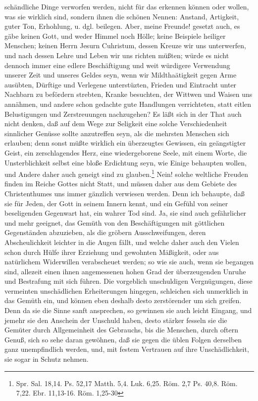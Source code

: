 schändliche Dinge verworfen werden, nicht für das erkennen können oder wollen, was sie wirklich sind, sondern ihnen die schönen Nennen: Anstand, Artigkeit, guter Ton, Erhohlung, u. dgl. beilegen. Aber, meine Freunde! gesetzt auch, es gäbe keinen Gott, und weder Himmel noch Hölle; keine Beispiele heiliger Menschen; keinen Herrn Jesurn Cuhristum, dessen Kreuze wir uns unterwerfen, und nach dessen Lehre und Leben wir uns richten müßten; würde es nicht dennoch immer eine edlere Beschäftigung und weit würdigere Verwendung unserer Zeit und unseres Geldes seyn, wenn wir Mildthaätigkeit gegen Arme ausübten, Dürftige und Verlegene unterstüzten, Frieden und Eintracht unter Nachbarn zu befördern strebten, Kranke besuchten, der Wittwen und Waisen uns annähmen, und andere schon gedachte gute Handlungen verrichteten, statt eitlen Belustigungen und Zerstreuungen nachzugehen? Es läßt sich in der That auch nicht denken, daß auf dem Wege zur Seligkeit eine solche Verschiedenheit sinnlicher Genüsse sollte anzutreffen seyn, als die mehrsten Menschen sich erlauben; denn sonst müßte wirklich ein überzeugtes Gewissen, ein geängstigter Geist, ein zerschlagendes Herz, eine wiedergeborene Seele, mit einem Worte, die Unsterblichkeit selbst eine bloße Erdichtung seyn, wie Einige behaupten wollen, und Andere daher auch geneigt sind zu glauben.\footnote{Spr. Sal. 18,14. Ps. 52,17 Matth. 5,4. Luk. 6,25. Röm. 2,7 Ps. 40,8. Röm. 7,22. Ebr. 11,13-16. Röm. 1,25-30} Nein! solche weltliche Freuden finden im Reiche Gottes nicht Statt, und müssen daher aus dem Gebiete des Christenthumes uns immer gänzlich verwiesen werden. Denn ich behaupte, daß sie für Jeden, der Gott in seinem Innern kennt, und ein Gefühl von seiner beseligenden Gegenwart hat, ein wahrer Tod sind. Ja, sie sind auch gefährlicher und mehr geeignet, das Gemüth von den Beschäftigungen mit göttlichen Gegenständen abzuzieben, als die gröbern Ausschweifungen, deren Abscheulichkeit leichter in die Augen fällt, und welche daher auch den Vielen schon durch Hülfe ihrer Erziehung und gewohnten Mäßigkeit, oder aus natürlichem Widerwillen verabscheuet werden; so wie sie auch, wenn sie begangen sind, allezeit einen ihnen angemessenen hohen Grad der überzeugenden Unruhe und Bestrafung mit sich führen. Die vorgeblich unschuldigen Vergnügungen, diese vermeinten unschädlichen Erheiterungen hingegen, schleichen sich unmerklich in das Gemüth ein, und können eben deshalb desto zerstörender um sich greifen. Denn da sie die Sinne sanft ansprechen, so gewinnen sie auch leicht Eingang, und jemehr sie den Anschein der Unschuld haben, desto stärker fesseln sie die Gemüter durch Allgemeinheit des Gebrauchs, bis die Menschen, durch oftern Genuß, sich so sehe daran gewöhnen, daß sie gegen die üblen Folgen derselben ganz unempfindlich werden, und, mit festem Vertrauen auf ihre Unschädlichkeit, sie sogar in Schutz nehmen.

